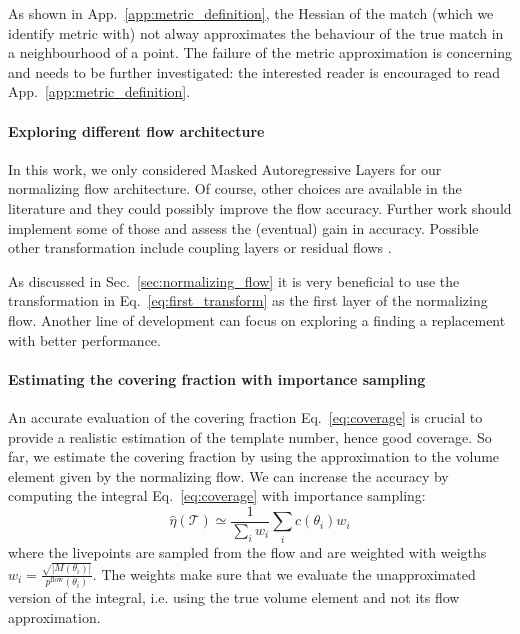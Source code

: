 \documentclass[twocolumn,showpacs,preprintnumbers,nofootinbib,prd,
superscriptaddress,10pt]{revtex4-2}
\begin{document}
As shown in App.~\ref{app:metric_definition}, the Hessian of the match (which we identify metric with) not alway approximates the behaviour of the true match in a neighbourhood of a point.
The failure of the metric approximation is concerning and needs to be further investigated: the interested reader is encouraged to read App.~\ref{app:metric_definition}.

\paragraph{Exploring different flow architecture}

In this work, we only considered Masked Autoregressive Layers for our normalizing flow architecture. Of course, other choices are available in the literature and they could possibly improve the flow accuracy. Further work should implement some of those and assess the (eventual) gain in accuracy.
Possible other transformation include coupling layers \cite{Dinh2014NICENI,Dinh2016DensityEU} or residual flows \cite{NIPS1999_e6384711, Behrmann2018InvertibleRN}.

As discussed in Sec.~\ref{sec:normalizing_flow} it is very beneficial to use the transformation in Eq.~\eqref{eq:first_transform} as the first layer of the normalizing flow. Another line of development can focus on exploring a finding a replacement with better performance.

\paragraph{Estimating the covering fraction with importance sampling}

An accurate evaluation of the covering fraction Eq.~\eqref{eq:coverage} is crucial to provide a realistic estimation of the template number, hence good coverage.
So far, we estimate the covering fraction by using the approximation to the volume element given by the normalizing flow.
We can increase the accuracy by computing the integral Eq.~\eqref{eq:coverage} with importance sampling:
\begin{equation}\label{eq:coverage_estimate_IS}
	\hat{\eta}(\mathcal{T}) \simeq \frac{1}{\sum_i w_i} \sum_i c(\theta_i) w_i 
\end{equation}
where the livepoints are sampled from the flow and are weighted with weigths $w_i = \frac{\sqrt{|M(\theta_i)|}}{p^\text{flow}(\theta_i)}$.
The weights make sure that we evaluate the unapproximated version of the integral, i.e. using the true volume element and not its flow approximation.
\end{document}
